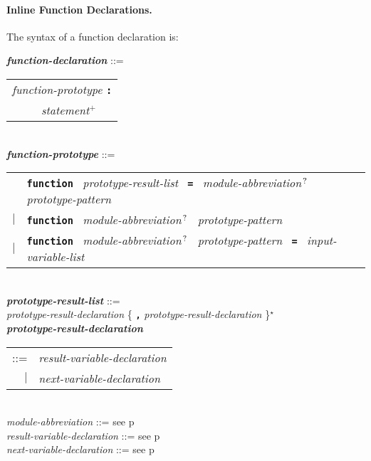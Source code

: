 \documentclass[12pt]{article}
\newcommand{\subsubsubsection}[1]{\paragraph[#1]{#1.}}
\newcommand{\TT}[1]{{\tt \bfseries #1}}
\newcommand{\STAR}{{\Large $^\star$}}
\newcommand{\PLUS}[1][]{{$^{+#1}$}}
\newcommand{\QMARK}{{$^{\,\mbox{\footnotesize ?}}$}}
\newcommand{\ttkey}[1]{{\tt \bfseries #1}}
\newcommand{\emkey}[1]{{\em \bfseries #1}}
\newcommand{\pagref}[1]{p\pageref{#1}}
\newenvironment{indpar}[1][0.3in]%
	{\begin{list}{}%
		     {\setlength{\itemsep}{0in}%
		      \setlength{\topsep}{0in}%
		      \setlength{\parsep}{1ex}%
		      \setlength{\labelwidth}{#1}%
		      \setlength{\leftmargin}{#1}%
		      \addtolength{\leftmargin}{\labelsep}}%
	 \item}%
	{\end{list}}
\begin{document}
\subsubsubsection{Inline Function Declarations}
\label{INLINE-FUNCTION-DECLARATIONS}

The syntax of a function declaration is:

\begin{indpar}
\emkey{function-declaration}\label{FUNCTION-DECLARATION}
    ::= \begin{tabular}[t]{l}
        {\em function-prototype} \TT{:} \\
	\TT{~~~~~}{\em statement}\PLUS{}
	\end{tabular}
\\[2ex]
\emkey{function-prototype}\label{FUNCTION-PROTOTYPE} ::= \\
\hspace*{0.25in}
    \begin{tabular}[t]{@{}rl}
        & \ttkey{function}~
          {\em prototype-result-list}~ \TT{=}~
          {\em module-abbreviation}\QMARK{}~
	                {\em prototype-pattern} \\
    $|$ & \ttkey{function}~ {\em module-abbreviation}\QMARK{}~
                           {\em prototype-pattern} \\
    $|$ & \ttkey{function}~ {\em module-abbreviation}\QMARK{}~
                           {\em prototype-pattern}~ \TT{=}~
                           {\em input-variable-list} \\
    \end{tabular}
\\[0.5ex]
\emkey{prototype-result-list} ::= \\
\hspace*{0.5in}
    {\em prototype-result-declaration}
    \{ \TT{,} {\em prototype-result-declaration} \}\STAR{}
\\[0.5ex]
\emkey{prototype-result-declaration} \\
\hspace*{1in}\begin{tabular}[t]{rl}
    ::= & {\em result-variable-declaration} \\
    $|$ & {\em next-variable-declaration} \\
    \end{tabular}
\\[0.5ex]
{\em module-abbreviation} ::= see \pagref{MODULE-ABBREVIATION}
\\[0.5ex]
{\em result-variable-declaration} ::= see \pagref{RESULT-VARIABLE-DECLARATION}
\\[0.5ex]
{\em next-variable-declaration} ::= see \pagref{NEXT-VARIABLE-DECLARATION}
\\[0.5ex]

\end{indpar}
\end{document}
